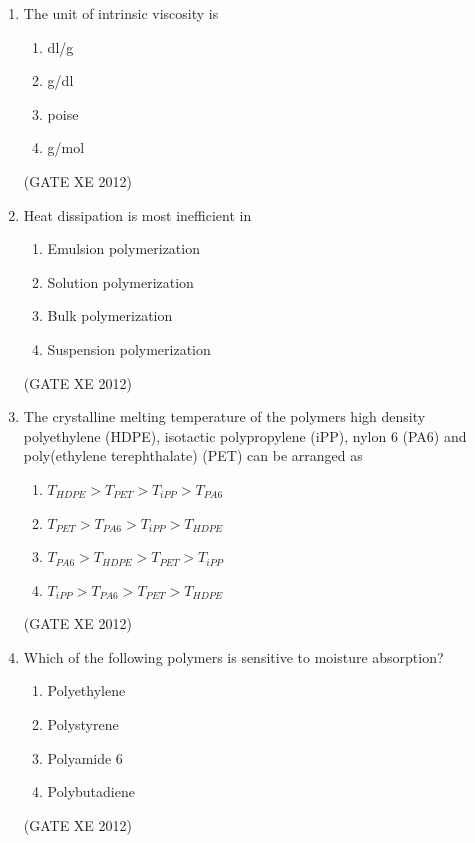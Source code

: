 \documentclass[12pt]{article}
\begin{document}
\begin{enumerate}
\item The unit of intrinsic viscosity is
\begin{multicols}{4}
\begin{enumerate}
\item dl/g
\item g/dl
\item poise
\item g/mol
\end{enumerate}
\end{multicols}
(GATE XE 2012)

\item Heat dissipation is most inefficient in
\begin{multicols}{2}
\begin{enumerate}
\item Emulsion polymerization
\item Solution polymerization
\item Bulk polymerization
\item Suspension polymerization
\end{enumerate}
\end{multicols}
(GATE XE 2012)

\item The crystalline melting temperature of the polymers high density polyethylene (HDPE), isotactic polypropylene (iPP), nylon 6 (PA6) and poly(ethylene terephthalate) (PET) can be arranged as
\begin{multicols}{2}
\begin{enumerate}
\item $T_{HDPE} > T_{PET} > T_{iPP} > T_{PA6}$
\item $T_{PET} > T_{PA6} > T_{iPP} > T_{HDPE}$
\item $T_{PA6} > T_{HDPE} > T_{PET} > T_{iPP}$
\item $T_{iPP} > T_{PA6} > T_{PET} > T_{HDPE}$
\end{enumerate}
\end{multicols}
(GATE XE 2012)

\item Which of the following polymers is sensitive to moisture absorption?
\begin{multicols}{4}
\begin{enumerate}
\item Polyethylene
\item Polystyrene
\item Polyamide 6
\item Polybutadiene
\end{enumerate}
\end{multicols}
(GATE XE 2012)


\end{enumerate}
\end{document}

